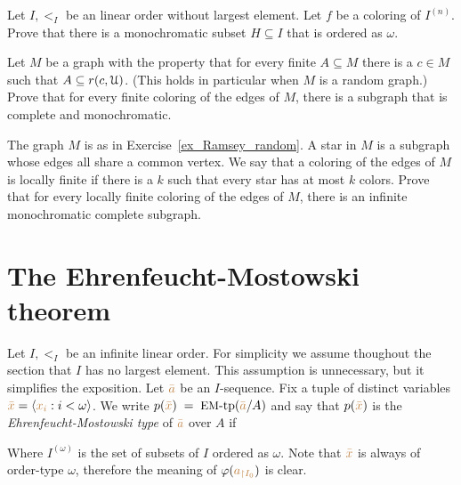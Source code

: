 \begin{exercise}\label{ex_Ramsey_order}
  Let $I,<_I$ be an linear order without largest element.
  Let $f$ be a coloring of $I^{(n)}$.
  Prove that there is a monochromatic subset $H\subseteq I$ that is ordered as $\omega$.
\end{exercise}

\begin{exercise}\label{ex_Ramsey_random}
    Let $M$ be a graph with the property that for every finite $A\subseteq M$ there is a $c\in M$ such that $A\subseteq r(c,\EuScript U)$. 
    (This holds in particular when $M$ is a random graph.)
    Prove that for every finite coloring of the edges of $M$, there is a subgraph that is complete and monochromatic.
\end{exercise}

\begin{exercise}
    The graph $M$ is as in Exercise~\ref{ex_Ramsey_random}.
    A star in $M$ is a subgraph whose edges all share a common vertex. We say that a coloring of the edges of $M$ is locally finite if there is a $k$ such that every star has at most $k$ colors.
    Prove that for every locally finite coloring of the edges of $M$, there is an infinite monochromatic complete subgraph.
\end{exercise}

\section{The Ehrenfeucht-Mostowski theorem}\label{EM}

Let $I,<_I$ be an infinite linear order.
For simplicity we assume thoughout the section that $I$ has no largest element.
This assumption is unnecessary, but it simplifies the exposition.
Let ${\color{brown}\bar a}$ be an $I$-sequence.
Fix a tuple of distinct variables ${\color{brown}\bar x}=\langle{\color{brown}x_i}: i<\omega\rangle$.
We write \emph{$p({\color{brown}\bar x})\;=\;\textrm{{\small EM}-tp}({\color{brown}\bar a}/A)$} and say that $p({\color{brown}\bar x})$ is the \emph{Ehren\-feucht-Mostowski type\/} of ${\color{brown}\bar a}$ over $A$ if


Where $I^{(\omega)}$ is the set of subsets of $I$ ordered as $\omega$.
Note that ${\color{brown}\bar x}$ is always of order-type $\omega$, therefore 
the meaning of $\varphi({\color{brown} a_{\restriction I_0}})$ is clear.

